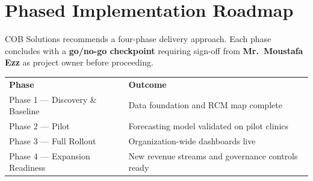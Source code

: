 \documentclass[11pt,a4paper]{article}
\begin{document}
\section{Phased Implementation Roadmap}

COB Solutions recommends a four-phase delivery approach. Each phase concludes with a
\textbf{go/no-go checkpoint} requiring sign-off from \textbf{Mr.\ Moustafa Ezz} as project
owner before proceeding.

\vspace{0.5em}
\begin{center}
\begin{tabularx}{\linewidth}{L{4.5cm} X}
  \color{white}\textbf{Phase} & \color{white}\textbf{Outcome} \\
  Phase 1 --- Discovery \& Baseline &
    Data foundation and RCM map complete \\
  Phase 2 --- Pilot &
    Forecasting model validated on pilot clinics \\
  Phase 3 --- Full Rollout &
    Organization-wide dashboards live \\
  Phase 4 --- Expansion Readiness &
    New revenue streams and governance controls ready \\
\end{tabularx}
\end{center}

\vspace{0.5em}
\begin{center}
\end{center}
\end{document}
